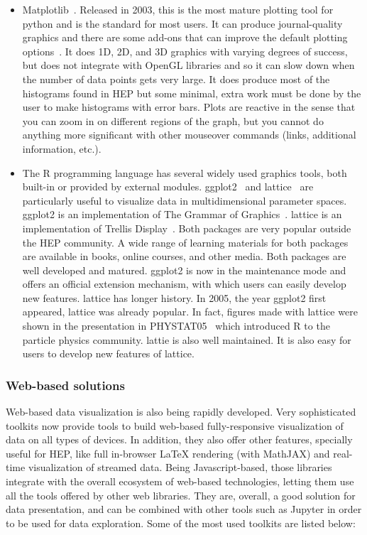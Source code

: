 \documentclass[12pt,a4paper]{article}
\begin{document}
\begin{itemize}
\item Matplotlib~\cite{Hunter2007}. Released in 2003, this is the most mature plotting tool for python and is the standard
for most users. It can produce journal-quality graphics and there are some add-ons that can improve the default plotting
options~\cite{seaborn}. It does 1D, 2D, and 3D graphics with varying degrees of success, but does not
integrate with OpenGL libraries and so it can slow down when the number of data points gets very large.
It does produce most of the histograms found in HEP but some minimal, extra work must be done by the user
to make histograms with error bars. Plots are reactive in the sense that you can zoom in on different regions of the graph,
but you cannot do anything more significant with other mouseover commands (links, additional information, etc.).

\item The R programming language has several widely used graphics tools, both built-in or provided by external modules.
ggplot2~\cite{Wickham2009} and lattice~\cite{Sarkar2008} are particularly useful to visualize data in multidimensional parameter spaces.
ggplot2 is an implementation of The Grammar of Graphics~\cite{Wilkinson2005}. lattice is an implementation of Trellis Display~\cite{Trellis}.
Both packages are very popular outside the HEP community. A wide range of learning materials for both packages are available in
books, online courses, and other media. Both packages are well developed and matured. ggplot2 is now in the maintenance mode
and offers an official extension mechanism, with which users can easily develop new features. lattice has longer history.
In 2005, the year ggplot2 first appeared, lattice was already popular. In fact, figures made with lattice were shown in the
presentation in PHYSTAT05~\cite{phystat05} which introduced R to the
particle physics community. lattie is also well maintained. It is also easy for users to develop new features of lattice.
\end{itemize}

\hypertarget{stats-web}{%
\subsubsection{Web-based solutions}\label{stats-web}}

Web-based data visualization is also being rapidly developed. Very sophisticated toolkits now provide tools to build web-based
fully-responsive visualization of data on all types of devices. In addition, they also offer other features, specially useful
for HEP, like full in-browser LaTeX rendering (with MathJAX) and real-time visualization of streamed data. Being Javascript-based,
those libraries integrate with the overall ecosystem of web-based technologies, letting them use all the tools offered by other
web libraries. They are, overall, a good solution for data presentation, and can be combined with other tools such as Jupyter
in order to be used for data exploration. Some of the most used toolkits are listed below:
\end{document}

